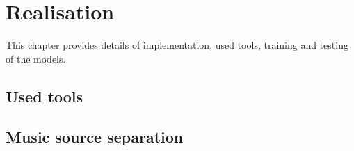 \chapter{Realisation}\label{ch:realisation}

This chapter provides details of implementation, used tools, training and testing of the models.

\section{Used tools}\label{sec:used-tools}


\section{Music source separation}\label{sec:realisation:music-source-separation}

